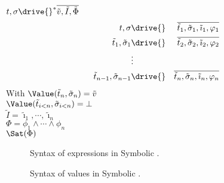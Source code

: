 \begin{definition}[Simulation]
  $t,\sigma\drive{}^* \overline{\tilde{v},\tilde{I},\tilde{\Phi}}$
\begin{align*}
  t,\sigma             & \drive{} & \overline{\tilde{t}_1,\tilde{\sigma}_1,\tilde{\imath}_1,\phi_1}\\
  \tilde{t}_1,\tilde{\sigma}_1         & \drive{} & \overline{\tilde{t}_2,\tilde{\sigma}_2,\tilde{\imath}_2,\phi_2}\\
                       & \vdots   & \\
  \tilde{t}_{n-1},\tilde{\sigma}_{n-1} & \drive{} & \overline{\tilde{t}_n,\tilde{\sigma}_n,\tilde{\imath}_n,\phi_n}
\end{align*}
With $\Value(\tilde{t}_n,\tilde{\sigma}_n)=\tilde{v}$\\
$\Value(\tilde{t}_{i<n},\tilde{\sigma}_{i<n})=\bot$\\
$\tilde{I}=\tilde{\imath}_1,\cdots,\tilde{\imath}_n$\\
$\Phi = \phi_1\land\cdots\land\phi_n$\\
$\Sat(\Phi)$
\end{definition}


\begin{figure}[ht]
  \small
  \caption{Syntax of expressions in Symbolic \TOPHAT.}
  \label{fig:syntaxexprsymtophat}
\end{figure}

\begin{figure}[ht]
  \small
  \caption{Syntax of values in Symbolic \TOPHAT.}
  \label{fig:syntaxvalues}
\end{figure}
